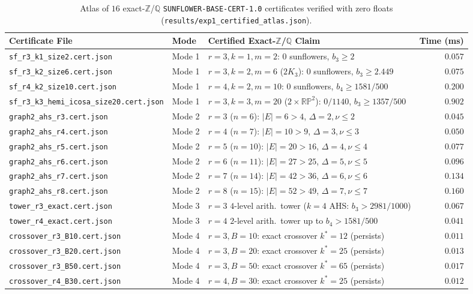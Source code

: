 \documentclass[11pt,a4paper]{article}
\theoremstyle{definition}
\theoremstyle{remark}
\newcommand{\QQ}{\mathbb{Q}}
\newcommand{\ZZ}{\mathbb{Z}}
\newcommand{\RP}{\mathbb{RP}}
\newcommand{\certschema}{\texttt{SUNFLOWER-BASE-CERT-1.0}}
\begin{document}
\begin{table}[t]
\centering
\caption{Atlas of $16$ exact-$\ZZ$/$\QQ$ \certschema{} certificates verified with zero floats (\texttt{results/exp1\_certified\_atlas.json}).}
\label{tab:atlas}
\scriptsize
\setlength{\tabcolsep}{3pt}
\begin{tabular}{@{}lllr@{}}
\toprule
Certificate File & Mode & Certified Exact-$\ZZ$/$\QQ$ Claim & Time (ms) \\
\midrule
\texttt{sf\_r3\_k1\_size2.cert.json} & Mode 1 & $r=3, k=1, m=2$: $0$ sunflowers, $b_3 \ge 2$ & $0.057$ \\
\texttt{sf\_r3\_k2\_size6.cert.json} & Mode 1 & $r=3, k=2, m=6$ ($2K_3$): $0$ sunflowers, $b_3 \ge 2.449$ & $0.075$ \\
\texttt{sf\_r4\_k2\_size10.cert.json} & Mode 1 & $r=4, k=2, m=10$: $0$ sunflowers, $b_4 \ge 1581/500$ & $0.200$ \\
\texttt{sf\_r3\_k3\_hemi\_icosa\_size20.cert.json} & Mode 1 & $r=3, k=3, m=20$ ($2\times\RP^2$): $0/1140$, $b_3 \ge 1357/500$ & $0.902$ \\
\midrule
\texttt{graph2\_ahs\_r3.cert.json} & Mode 2 & $r=3$ ($n=6$): $|E|=6 > 4$, $\Delta=2, \nu \le 2$ & $0.045$ \\
\texttt{graph2\_ahs\_r4.cert.json} & Mode 2 & $r=4$ ($n=7$): $|E|=10 > 9$, $\Delta=3, \nu \le 3$ & $0.050$ \\
\texttt{graph2\_ahs\_r5.cert.json} & Mode 2 & $r=5$ ($n=10$): $|E|=20 > 16$, $\Delta=4, \nu \le 4$ & $0.077$ \\
\texttt{graph2\_ahs\_r6.cert.json} & Mode 2 & $r=6$ ($n=11$): $|E|=27 > 25$, $\Delta=5, \nu \le 5$ & $0.096$ \\
\texttt{graph2\_ahs\_r7.cert.json} & Mode 2 & $r=7$ ($n=14$): $|E|=42 > 36$, $\Delta=6, \nu \le 6$ & $0.134$ \\
\texttt{graph2\_ahs\_r8.cert.json} & Mode 2 & $r=8$ ($n=15$): $|E|=52 > 49$, $\Delta=7, \nu \le 7$ & $0.160$ \\
\midrule
\texttt{tower\_r3\_exact.cert.json} & Mode 3 & $r=3$ $4$-level arith.\ tower ($k=4$ AHS: $b_3 > 2981/1000$) & $0.067$ \\
\texttt{tower\_r4\_exact.cert.json} & Mode 3 & $r=4$ $2$-level arith.\ tower up to $b_4 > 1581/500$ & $0.041$ \\
\midrule
\texttt{crossover\_r3\_B10.cert.json} & Mode 4 & $r=3, B=10$: exact crossover $k^* = 12$ (persists) & $0.011$ \\
\texttt{crossover\_r3\_B20.cert.json} & Mode 4 & $r=3, B=20$: exact crossover $k^* = 25$ (persists) & $0.013$ \\
\texttt{crossover\_r3\_B50.cert.json} & Mode 4 & $r=3, B=50$: exact crossover $k^* = 65$ (persists) & $0.017$ \\
\texttt{crossover\_r4\_B30.cert.json} & Mode 4 & $r=4, B=30$: exact crossover $k^* = 25$ (persists) & $0.012$ \\
\bottomrule
\end{tabular}
\end{table}
\end{document}
